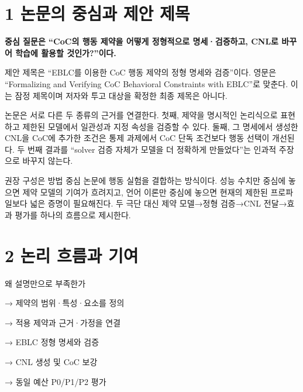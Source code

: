 \documentclass[11pt,a4paper]{article}
\begin{document}
\section*{1 논문의 중심과 제안 제목}

\textbf{중심 질문은 “CoC의 행동 제약을 어떻게 정형적으로 명세·검증하고, CNL로 바꾸어 학습에 활용할 것인가?”이다.}\par

제안 제목은 “EBLC를 이용한 CoC 행동 제약의 정형 명세와 검증”이다. 영문은 “Formalizing and Verifying CoC Behavioral Constraints with EBLC”로 맞춘다. 이는 잠정 제목이며 저자와 투고 대상을 확정한 최종 제목은 아니다.\par

논문은 서로 다른 두 종류의 근거를 연결한다. 첫째, 제약을 명시적인 논리식으로 표현하고 제한된 모델에서 일관성과 지정 속성을 검증할 수 있다. 둘째, 그 명세에서 생성한 CNL을 CoC에 추가한 조건은 통제 과제에서 CoC 단독 조건보다 행동 선택이 개선된다. 두 번째 결과를 “solver 검증 자체가 모델을 더 정확하게 만들었다”는 인과적 주장으로 바꾸지 않는다.\par

권장 구성은 방법 중심 논문에 행동 실험을 결합하는 방식이다. 성능 수치만 중심에 놓으면 제약 모델의 기여가 흐려지고, 언어 이론만 중심에 놓으면 현재의 제한된 프로파일보다 넓은 증명이 필요해진다. 두 극단 대신 제약 모델→정형 검증→CNL 전달→효과 평가를 하나의 흐름으로 제시한다.\par

\section*{2 논리 흐름과 기여}

\begingroup\small\ttfamily\setlength{\parskip}{1pt}
\noindent\hspace*{0.0em}왜 설명만으로 부족한가\par
\noindent\hspace*{1.0em}→ 제약의 범위·특성·요소를 정의\par
\noindent\hspace*{1.0em}→ 적용 제약과 근거·가정을 연결\par
\noindent\hspace*{1.0em}→ EBLC 정형 명세와 검증\par
\noindent\hspace*{1.0em}→ CNL 생성 및 CoC 보강\par
\noindent\hspace*{1.0em}→ 동일 예산 P0/P1/P2 평가\par\endgroup\par
\end{document}
